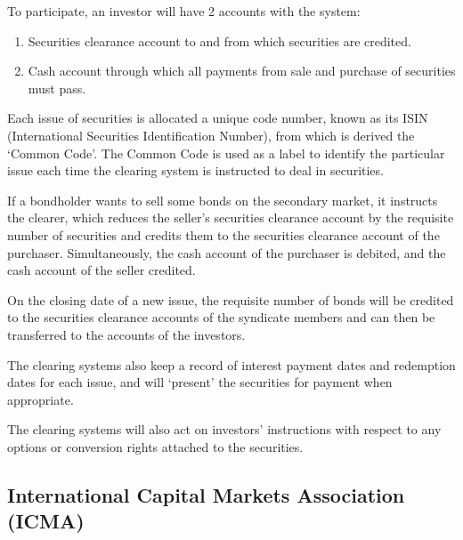 \documentclass[
]{article}
\providecommand{\tightlist}{%
  \setlength{\itemsep}{0pt}\setlength{\parskip}{0pt}}
\begin{document}
To participate, an investor will have 2 accounts with the system:

\begin{enumerate}
\def\labelenumi{\arabic{enumi}.}
\tightlist
\item
  Securities clearance account to and from which securities are
  credited.
\item
  Cash account through which all payments from sale and purchase of
  securities must pass.
\end{enumerate}

Each issue of securities is allocated a unique code number, known as its
ISIN (International Securities Identification Number), from which is
derived the `Common Code'. The Common Code is used as a label to
identify the particular issue each time the clearing system is
instructed to deal in securities.

If a bondholder wants to sell some bonds on the secondary market, it
instructs the clearer, which reduces the seller's securities clearance
account by the requisite number of securities and credits them to the
securities clearance account of the purchaser. Simultaneously, the cash
account of the purchaser is debited, and the cash account of the seller
credited.

On the closing date of a new issue, the requisite number of bonds will
be credited to the securities clearance accounts of the syndicate
members and can then be transferred to the accounts of the investors.

The clearing systems also keep a record of interest payment dates and
redemption dates for each issue, and will `present' the securities for
payment when appropriate.

The clearing systems will also act on investors' instructions with
respect to any options or conversion rights attached to the securities.

\hypertarget{international-capital-markets-association-icma}{%
\subsection{International Capital Markets Association
(ICMA)}\label{international-capital-markets-association-icma}}
\end{document}
